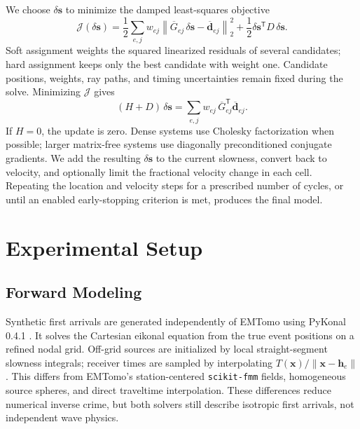 \documentclass[12pt, a4paper]{article}
\begin{document}
We choose $\delta\mathbf s$ to minimize the damped least-squares objective \parencite{levenberg1944}
\begin{equation}
\mathcal J(\delta\mathbf s)=
\frac12\sum_{e,j}w_{ej}\left\|\overline G_{ej}\,\delta\mathbf s-\overline{\mathbf d}_{ej}\right\|_2^2
+\frac12\delta\mathbf s^{\mathsf T}D\,\delta\mathbf s.
\label{eq:weighted_update_objective}
\end{equation}
Soft assignment weights the squared linearized residuals of several candidates; hard assignment keeps only the best candidate with weight one. Candidate positions, weights, ray paths, and timing uncertainties remain fixed during the solve. Minimizing $\mathcal J$ gives
\begin{equation}
(H+D)\,\delta\mathbf s=\sum_{e,j}w_{ej}\,\overline G_{ej}^{\mathsf T}\overline{\mathbf d}_{ej}.
\label{eq:slowness_update}
\end{equation}
If $H=0$, the update is zero. Dense systems use Cholesky factorization when possible; larger matrix-free systems use diagonally preconditioned conjugate gradients. We add the resulting $\delta\mathbf s$ to the current slowness, convert back to velocity, and optionally limit the fractional velocity change in each cell. Repeating the location and velocity steps for a prescribed number of cycles, or until an enabled early-stopping criterion is met, produces the final model.

\section{Experimental Setup}
\label{sec:experimental_setup}

\subsection{Forward Modeling}
\label{subsec:synthetic_data}

Synthetic first arrivals are generated independently of EMTomo using PyKonal 0.4.1 \parencite{white2020pykonal}. It solves the Cartesian eikonal equation from the true event positions on a refined nodal grid. Off-grid sources are initialized by local straight-segment slowness integrals; receiver times are sampled by interpolating $T(\mathbf x)/\|\mathbf x-\mathbf h_e\|$. This differs from EMTomo's station-centered \texttt{scikit-fmm} fields, homogeneous source spheres, and direct traveltime interpolation. These differences reduce numerical inverse crime, but both solvers still describe isotropic first arrivals, not independent wave physics.
\end{document}
